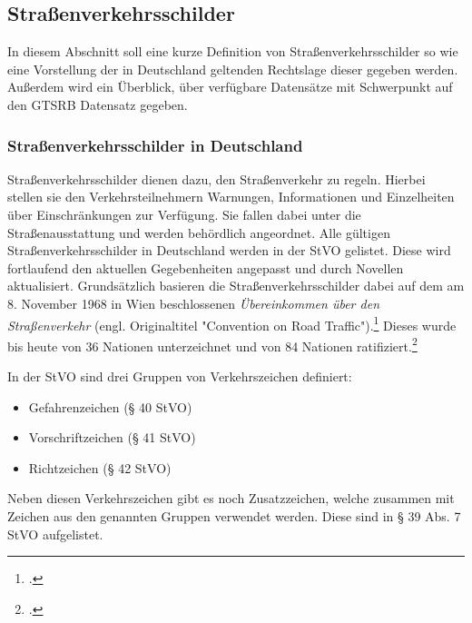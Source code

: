 \subsection{Straßenverkehrsschilder}
In diesem Abschnitt soll eine kurze Definition von Straßenverkehrsschilder so wie eine Vorstellung der in Deutschland geltenden Rechtslage dieser gegeben werden. Außerdem wird ein Überblick, über verfügbare Datensätze mit Schwerpunkt auf den \ac{GTSRB} Datensatz gegeben.

\subsubsection{Straßenverkehrsschilder in Deutschland}
Straßenverkehrsschilder dienen dazu, den Straßenverkehr zu regeln. Hierbei stellen sie den Verkehrsteilnehmern Warnungen, Informationen und Einzelheiten über Einschränkungen zur Verfügung. Sie fallen dabei unter die Straßenausstattung und werden behördlich angeordnet.  Alle gültigen Straßenverkehrsschilder in Deutschland werden in der \ac{StVO} gelistet. Diese wird fortlaufend den aktuellen Gegebenheiten angepasst und durch Novellen aktualisiert. Grundsätzlich basieren die Straßenverkehrsschilder dabei auf dem am 8. November 1968 in Wien beschlossenen \textit{Übereinkommen über den Straßenverkehr} (engl. Originaltitel "Convention on Road Traffic").\footcite[Vgl.][o.S.]{unConventionRoadTraffic1977} 
 Dieses wurde bis heute von 36 Nationen unterzeichnet und von 84 Nationen ratifiziert.\footcite[Vgl.][1-14]{unUnitedNationsTreaty2020}

In der \ac{StVO} sind drei Gruppen von Verkehrszeichen definiert:
\begin{itemize}
    \item Gefahrenzeichen (§ 40 \ac{StVO})
    \item Vorschriftzeichen (§ 41 \ac{StVO})
    \item Richtzeichen (§ 42 \ac{StVO})
\end{itemize}

Neben diesen Verkehrszeichen gibt es noch Zusatzzeichen, welche zusammen mit Zeichen aus den genannten Gruppen verwendet werden. Diese sind in § 39 Abs. 7 \ac{StVO} aufgelistet.


